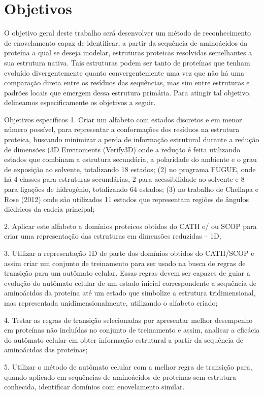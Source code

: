 \chapter{Objetivos}

O objetivo geral deste trabalho será desenvolver um método de reconhecimento de
enovelamento capaz de identificar, a partir da sequência de aminoácidos da proteína a qual se
deseja modelar, estruturas proteicas resolvidas semelhantes a sua estrutura nativa. Tais
estruturas podem ser tanto de proteínas que tenham evoluído divergentemente quanto
convergentemente uma vez que não há uma comparação direta entre os resíduos das
sequências, mas sim entre estruturas e padrões locais que emergem dessa estrutura primária.
Para atingir tal objetivo, delineamos especificamente os objetivos a seguir.

Objetivos específicos
1. Criar um alfabeto com estados discretos e em menor número possível, para
representar a conformações dos resíduos na estrutura proteica, buscando
minimizar a perda de informação estrutural durante a redução de dimensões (3D
Enviroments (Verify3D) onde a redução é feita utilizando estados que combinam
a estrutura secundária, a polaridade do ambiente e o grau de exposição ao
solvente, totalizando 18 estados; (2) no programa FUGUE, onde há 4 classes para
estruturas secundárias, 2 para acessibilidade ao solvente e 8 para ligações de
hidrogênio, totalizando 64 estados; (3) no trabalho de Chellapa e Rose (2012) onde são utilizados 11 estados que representam regiões de ângulos diédricos da
cadeia principal;

2. Aplicar este alfabeto a domínios proteicos obtidos do CATH e/ ou SCOP para
criar uma representação das estruturas em dimensões reduzidas – 1D;

3. Utilizar a representação 1D de parte dos domínios obtidos do CATH/SCOP e
assim criar um conjunto de treinamento para ser usado na busca de regras de
transição para um autômato celular. Essas regras devem ser capazes de guiar a
evolução do autômato celular de um estado inicial correspondente a sequência
de aminoácidos da proteína até um estado que simbolize a estrutura
tridimensional, mas representada unidimensionalmente, utilizando o alfabeto
criado;

4. Testar as regras de transição selecionadas por apresentar melhor desempenho em
proteínas não incluídas no conjunto de treinamento e assim, analisar a eficácia do
autômato celular em obter informação estrutural a partir da sequência de
aminoácidos das proteínas;

5. Utilizar o método de autômato celular com a melhor regra de transição para,
quando aplicado em sequências de aminoácidos de proteínas sem estrutura
conhecida, identificar domínios com enovelamento similar.